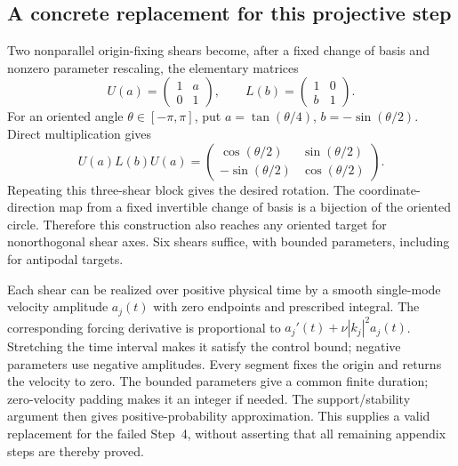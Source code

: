 \documentclass[10pt]{article}
\begin{document}
\subsection*{A concrete replacement for this projective step}
Two nonparallel origin-fixing shears become, after a fixed change of basis and nonzero parameter rescaling, the elementary matrices \[U(a)=\begin{pmatrix}1&a\\0&1\end{pmatrix},\qquad
 L(b)=\begin{pmatrix}1&0\\b&1\end{pmatrix}.\] For an oriented angle \(\theta\in[-\pi,\pi]\), put \(a=\tan(\theta/4)\), \(b=-\sin(\theta/2)\). Direct multiplication gives \[U(a)L(b)U(a)=
 \begin{pmatrix}
 \cos(\theta/2)&\sin(\theta/2)\\
 -\sin(\theta/2)&\cos(\theta/2)
 \end{pmatrix}.
 \tag{10}\] Repeating this three-shear block gives the desired rotation. The coordinate-direction map from a fixed invertible change of basis is a bijection of the oriented circle. Therefore this construction also reaches any oriented target for nonorthogonal shear axes. Six shears suffice, with bounded parameters, including for antipodal targets.\par
Each shear can be realized over positive physical time by a smooth single-mode velocity amplitude \(a_j(t)\) with zero endpoints and prescribed integral. The corresponding forcing derivative is proportional to \(a_j'(t)+\nu|k_j|^2a_j(t)\). Stretching the time interval makes it satisfy the control bound; negative parameters use negative amplitudes. Every segment fixes the origin and returns the velocity to zero. The bounded parameters give a common finite duration; zero-velocity padding makes it an integer if needed. The support/stability argument then gives positive-probability approximation. This supplies a valid replacement for the failed Step 4, without asserting that all remaining appendix steps are thereby proved.\par
\end{document}

